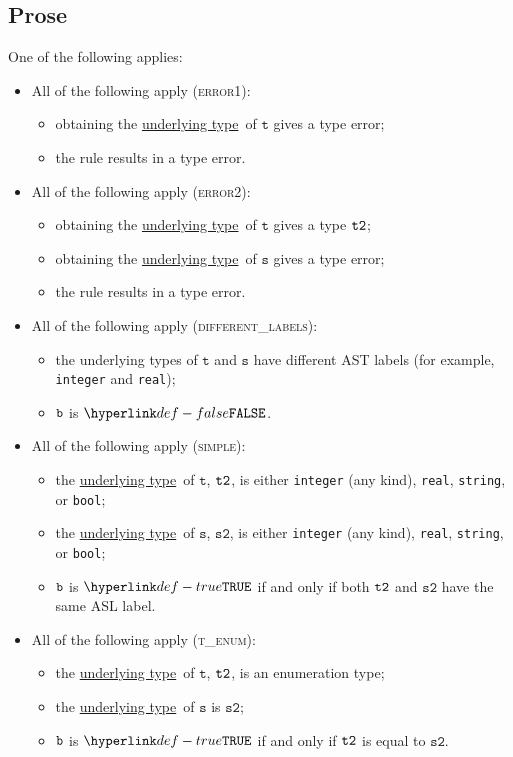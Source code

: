 \documentclass{book}
\newcommand\underlyingtype[0]{\hyperlink{def-underlyingtype}{underlying type}}
\newcommand\vt[0]{\texttt{t}}
\newcommand\vs[0]{\texttt{s}}
\newcommand\vstwo[0]{\texttt{s2}}
\begin{document}
\subsection{Prose}
One of the following applies:
\begin{itemize}
\item All of the following apply (\textsc{error1}):
  \begin{itemize}
  \item obtaining the \underlyingtype\ of $\vt$ gives a type error;
  \item the rule results in a type error.
  \end{itemize}

\item All of the following apply (\textsc{error2}):
  \begin{itemize}
    \item obtaining the \underlyingtype\ of $\vt$ gives a type $\texttt{t2}$;
    \item obtaining the \underlyingtype\ of $\vs$ gives a type error;
    \item the rule results in a type error.
    \end{itemize}

\item All of the following apply (\textsc{different\_labels}):
  \begin{itemize}
  \item the underlying types of $\vt$ and $\vs$ have different AST labels
  (for example, \texttt{integer} and \texttt{real});
  \item $\texttt{b}$ is $\False$.
  \end{itemize}

\item All of the following apply (\textsc{simple}):
  \begin{itemize}
  \item the \underlyingtype\ of $\vt$, $\texttt{t2}$, is either \texttt{integer} (any kind), \texttt{real}, \texttt{string}, or \texttt{bool};
  \item the \underlyingtype\ of $\vs$, $\vstwo$, is either \texttt{integer} (any kind), \texttt{real}, \texttt{string}, or \texttt{bool};
  \item $\texttt{b}$ is $\True$ if and only if both $\texttt{t2}$ and $\vstwo$ have the same ASL label.
  \end{itemize}

\item All of the following apply (\textsc{t\_enum}):
  \begin{itemize}
  \item the \underlyingtype\ of $\vt$, $\texttt{t2}$, is an enumeration type;
  \item the \underlyingtype\ of $\vs$ is $\vstwo$;
  \item $\texttt{b}$ is $\True$ if and only if $\texttt{t2}$ is equal to $\vstwo$.
  \end{itemize}


\end{itemize}
\end{document}
